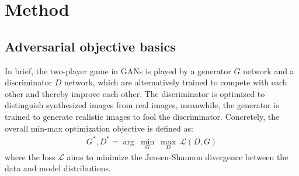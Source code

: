 \documentclass[10pt,twocolumn,letterpaper]{article}
\begin{document}
\section{Method}

\subsection{Adversarial objective basics}
In brief, the two-player game in GANs \cite{goodfellow2014generative} is played by a generator $G$ network and a discriminator $D$ network, which are alternatively trained to compete with each other and thereby improve each other. The discriminator is optimized to distinguish synthesized images from real images, meanwhile, the generator is trained to generate realistic images to fool the discriminator. Concretely, the overall min-max optimization objective is defined as: 
\begin{equation}
\label{equ:GAN}
\begin{split}
G^*, D^* = \arg~\underset{G}{\min}\ \underset{D}{\max}~ \mathcal{L}(D, G)
\end{split}
\end{equation}
where the loss $\mathcal{L}$ aims to minimize the Jensen-Shannon divergence between the data and model distributions. 


\end{document}
